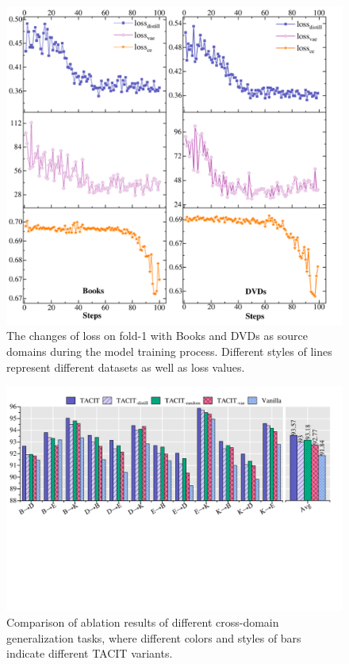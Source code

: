 \documentclass[letterpaper]{article} %
\begin{document}
\begin{figure}[t]
	\centering
	\includegraphics[width=0.99\columnwidth]{loss.pdf}
	\caption{The changes of loss on fold-1 with Books and DVDs as source domains during the model training process. Different styles of lines represent different datasets as well as loss values. }
	\label{fig:loss}
\end{figure}

\begin{figure}[t]
	\centering
	\includegraphics[width=1.7\columnwidth]{abl.pdf}
	\caption{Comparison of ablation results of different cross-domain generalization tasks, where different colors and styles of bars indicate different TACIT variants. }
	\label{fig:abl}
\end{figure}
\end{document}
